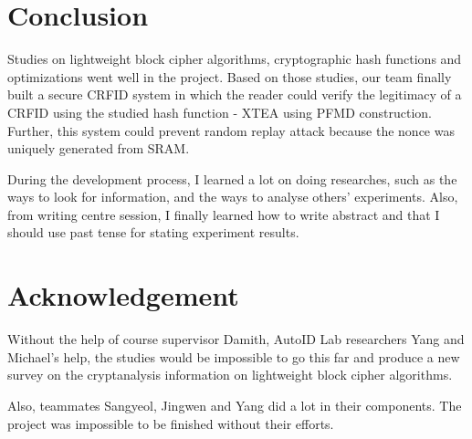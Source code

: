 \documentclass[sigconf, review=false]{acmart}
\begin{document}
\section{Conclusion}
Studies on lightweight block cipher algorithms, cryptographic hash functions and optimizations went well in the project.
Based on those studies, our team finally built a secure CRFID system in which the reader could verify the legitimacy of a CRFID using the studied hash function - XTEA using PFMD construction.
Further, this system could prevent random replay attack because the nonce was uniquely generated from SRAM.

During the development process, I learned a lot on doing researches, such as the ways to look for information, and the ways to analyse others' experiments.
Also, from writing centre session, I finally learned how to write abstract and that I should use past tense for stating experiment results.


\section{Acknowledgement}
Without the help of course supervisor Damith, AutoID Lab researchers Yang and Michael's help,
the studies would be impossible to go this far and produce a new survey on the cryptanalysis information on lightweight block cipher algorithms.

Also, teammates Sangyeol, Jingwen and Yang did a lot in their components. The project was impossible to be finished without their efforts.





\end{document}
